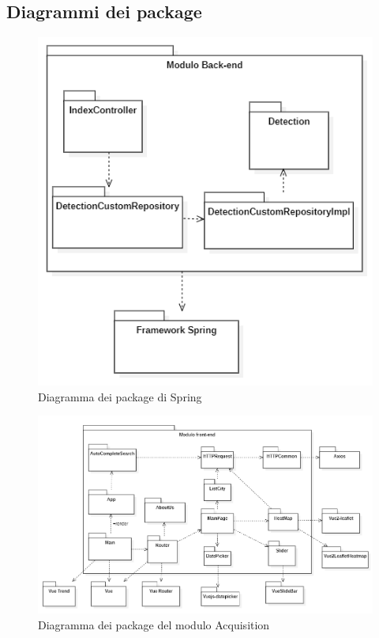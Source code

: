 \subsection{Diagrammi dei package}
\begin{figure}[H]
  \begin{center}
    \includegraphics[scale=0.8]{../immagini/diag_PB/diag_pack_spring.png}
    \caption{Diagramma dei package di Spring}
  \end{center}
\end{figure}

\begin{figure}[H]
  \begin{center}
    \includegraphics[scale=0.65]{../immagini/diag_PB/diag_pack_vue.png}
    \caption{Diagramma dei package del modulo Acquisition}
  \end{center}
\end{figure}

